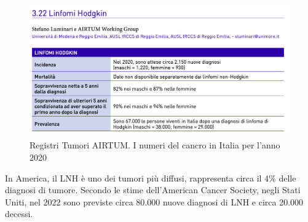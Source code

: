 \begin{figure}[H]
    \begin{center}
    \includegraphics[width=0.5\columnwidth]{img/2020.png}
    \vspace{-3mm}
    \end{center}
    \caption{Registri Tumori AIRTUM. I numeri del cancro in Italia per l’anno 2020
    \cite{img5}}

\end{figure}

In America, il LNH è uno dei tumori più diffusi, rappresenta circa il 4\% delle diagnosi di tumore\cite{Americanstatistic}. 
Secondo le stime dell’American Cancer Society, negli Stati Uniti, nel 2022 sono previste circa 80.000 nuove 
diagnosi di LNH e circa 20.000 decessi.

